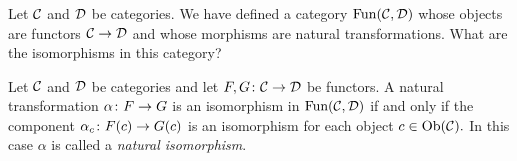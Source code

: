 \documentclass[CT4S-EN-RU]{subfiles}
\begin{document}
\subsubsection{}

\begin{blockENG}
Let $\mathcal{C}$ and $\mathcal{D}$ be categories. We have defined a category $\textnormal{Fun}(\mathcal{C},\mathcal{D})$ whose objects are functors $\mathcal{C}\rightarrow\mathcal{D}$ and whose morphisms are natural transformations. What are the isomorphisms in this category? 
\end{blockENG}

\begin{blockRUS}
\end{blockRUS}

\begin{lemmaENG}\label{lemma:natural iso}
Let $\mathcal{C}$ and $\mathcal{D}$ be categories and let $F,G\colon\mathcal{C}\rightarrow\mathcal{D}$ be functors. A natural transformation $\alpha\colon F\rightarrow G$ is an isomorphism in $\textnormal{Fun}(\mathcal{C},\mathcal{D})$ if and only if the component $\alpha_c\colon F(c)\rightarrow G(c)$ is an isomorphism for each object $c\in\textnormal{Ob}(\mathcal{C}).$ In this case $\alpha$ is called a {\em natural isomorphism}.
\end{lemmaENG}

\begin{lemmaRUS}\label{lemma:natural iso}
\end{lemmaRUS}
\end{document}
